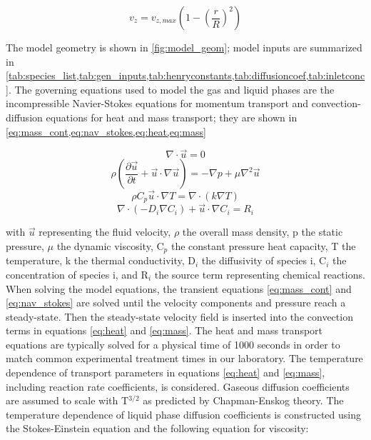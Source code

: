 \begin{equation}
    v_{z} = v_{z,max}\left(1-\left(\frac{r}{R}\right)^2\right)
    \label{eq:v_in}
\end{equation}

 The model geometry is shown in \cref{fig:model_geom}; model inputs are summarized in \cref{tab:species_list,tab:gen_inputs,tab:henryconstants,tab:diffusioncoef,tab:inletconc}. The governing equations used to model the gas and liquid phases are the incompressible Navier-Stokes equations for momentum transport and convection-diffusion equations for heat and mass transport; they are shown in \cref{eq:mass_cont,eq:nav_stokes,eq:heat,eq:mass}

\begin{equation}
    \nabla\cdot\vec{u}=0
    \label{eq:mass_cont}
\end{equation}
\begin{equation}
    \rho \left(\frac{\partial\vec{u}}{\partial t}+\vec{u}\cdot\nabla\vec{u}\right)=-\nabla p+\mu \nabla^2 \vec{u}
    \label{eq:nav_stokes}
\end{equation}
\begin{equation}
    \rho C_p\vec{u}\cdot\nabla T = \nabla\cdot\left(k\nabla T\right)
    \label{eq:heat}
\end{equation}
\begin{equation}
    \nabla\cdot\left(-D_i\nabla C_i\right) + \vec{u}\cdot\nabla C_i = R_i
    \label{eq:mass}
\end{equation}

with $\vec{u}$ representing the fluid velocity, $\rho$ the overall mass density, p the static pressure, $\mu$ the dynamic viscosity, C$_p$ the constant pressure heat capacity, T the temperature, k the thermal conductivity, D$_i$ the diffusivity of species i, C$_i$ the concentration of species i, and R$_i$ the source term representing chemical reactions. When solving the model equations, the transient equations \ref{eq:mass_cont} and \ref{eq:nav_stokes} are solved until the velocity components and pressure reach a steady-state. Then the steady-state velocity field is inserted into the convection terms in equations \ref{eq:heat} and \ref{eq:mass}. The heat and mass transport equations are typically solved for a physical time of 1000 seconds in order to match common experimental treatment times in our laboratory. The temperature dependence of transport parameters in equations \ref{eq:heat} and \ref{eq:mass}, including reaction rate coefficients, is considered. Gaseous diffusion coefficients are assumed to scale with T$^{3/2}$ as predicted by Chapman-Enskog theory. \cite[p. 119]{cussler2009diffusion} The temperature dependence of liquid phase diffusion coefficients is constructed using the Stokes-Einstein equation \cite[p. 529]{bird2007transport} and the following equation for viscosity: \cite[p. 31]{bird2007transport}

